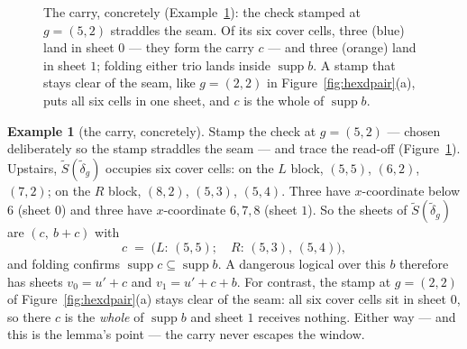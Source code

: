\documentclass[11pt]{article}
\theoremstyle{plain}
\theoremstyle{definition}
\newtheorem{example}[theorem]{Example}
\theoremstyle{remark}
\newcommand{\suppop}{\operatorname{supp}}
\begin{document}
\begin{figure}[ht]
\centering
{}
\caption{The carry, concretely (Example~\ref{ex:carry}): the check stamped
at $g = (5,2)$ straddles the seam. Of its six cover cells, three (blue)
land in sheet $0$ --- they form the carry $c$ --- and three (orange) land
in sheet $1$; folding either trio lands inside $\suppop b$. A stamp that
stays clear of the seam, like $g = (2,2)$ in Figure~\ref{fig:hexdpair}(a),
puts all six cells in one sheet, and $c$ is the whole of $\suppop b$.}
\label{fig:carry}
\end{figure}

\begin{example}[the carry, concretely]\label{ex:carry}
Stamp the check at $g = (5,2)$ --- chosen deliberately so the stamp
straddles the seam --- and trace the read-off (Figure~\ref{fig:carry}).
Upstairs, $\widetilde S(\widetilde\delta_g)$ occupies six cover cells: on
the $L$ block, $(5,5)$, $(6,2)$, $(7,2)$; on the $R$ block, $(8,2)$,
$(5,3)$, $(5,4)$. Three have $x$-coordinate below $6$ (sheet $0$) and
three have $x$-coordinate $6, 7, 8$ (sheet $1$). So the sheets of
$\widetilde S(\widetilde\delta_g)$ are $(c,\ b + c)$ with
\[
c \;=\; \bigl(\text{$L$: } (5,5);\quad \text{$R$: } (5,3),\, (5,4)\bigr),
\]
and folding confirms $\suppop c \subseteq \suppop b$. A dangerous logical
over this $b$ therefore has sheets $v_0 = u' + c$ and $v_1 = u' + c + b$.
For contrast, the stamp at $g = (2,2)$ of Figure~\ref{fig:hexdpair}(a)
stays clear of the seam: all six cover cells sit in sheet $0$, so there
$c$ is the \emph{whole} of $\suppop b$ and sheet $1$ receives nothing.
Either way --- and this is the lemma's point --- the carry never escapes
the window.
\end{example}
\end{document}

